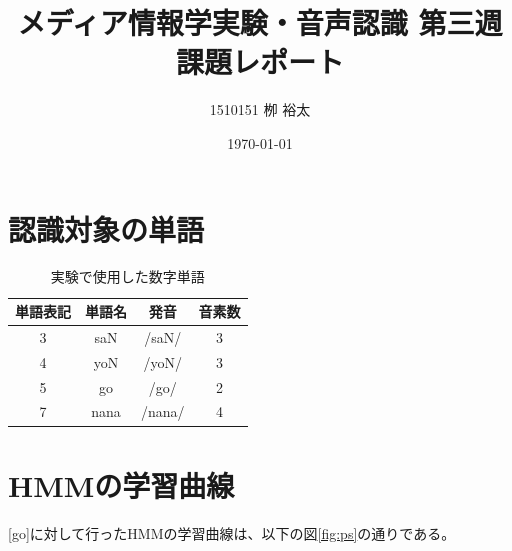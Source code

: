 \documentclass[11pt,a4paper, uplatex]{jsarticle}
\title{メディア情報学実験・音声認識 第三週課題レポート}
\author{1510151  栁 裕太}
\date{\today}
\begin{document}
\maketitle
\section{認識対象の単語}
\begin{table}[htbp]
  \begin{center}
    \caption{実験で使用した数字単語}
    \label{tb:numbers}
    \begin{tabular}{c|c|c|c}
      \hline
      単語表記 & 単語名 & 発音 & 音素数 \\ \hline \hline
      3 & saN & /saN/ & 3 \\
      4 & yoN & /yoN/ & 3 \\
      5 & go & /go/ & 2 \\
      7 & nana & /nana/ & 4 \\
      \hline
    \end{tabular}
  \end{center}
\end{table}

\section{HMMの学習曲線}

[go]に対して行ったHMMの学習曲線は、以下の図\ref{fig:ps}の通りである。
\end{document}
